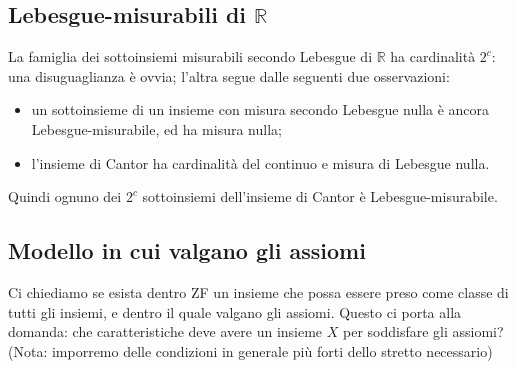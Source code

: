 \documentclass[a4paper,10pt,oneside]{article}
\theoremstyle{plain}
\theoremstyle{definition}
\theoremstyle{remark}
\begin{document}
\subsection{Lebesgue-misurabili di $\mathbb R$}

La famiglia dei sottoinsiemi misurabili secondo Lebesgue di $\mathbb R$ ha cardinalità $2^c$: una disuguaglianza è ovvia; l'altra segue dalle seguenti due osservazioni:
\begin{itemize}
 \item un sottoinsieme di un insieme con misura secondo Lebesgue nulla è ancora Lebesgue-misurabile, ed ha misura nulla;
 \item l'insieme di Cantor ha cardinalità del continuo e misura di Lebesgue nulla.
\end{itemize}
Quindi ognuno dei $2^c$ sottoinsiemi dell'insieme di Cantor è Lebesgue-misurabile.

\subsection{Modello in cui valgano gli assiomi}

Ci chiediamo se esista dentro ZF un insieme che possa essere preso come classe di tutti gli insiemi, e dentro il quale valgano gli assiomi. Questo ci porta alla domanda: che caratteristiche deve avere un insieme $X$ per soddisfare gli assiomi? (Nota: imporremo delle condizioni in generale più forti dello stretto necessario)
\end{document}
